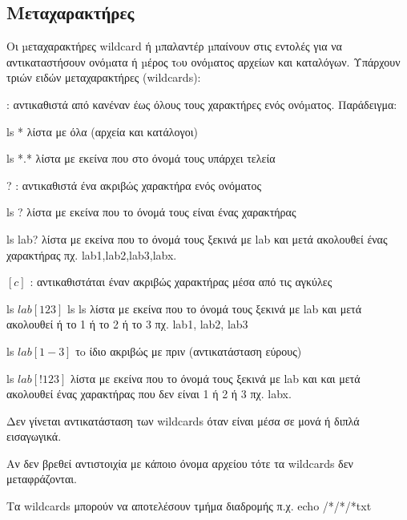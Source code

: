 \subsection{Μεταχαρακτήρες}

Oι µεταχαρακτήρες wildcard ή µπαλαντέρ µπαίνουν στις εντολές για να αντικαταστήσουν ονόµατα ή µέρος τoυ ονόµατος αρχείων και καταλόγων.
Υπάρχουν τριών ειδών μεταχαρακτήρες (wildcards):

\begin{packed_item}
  \item * : αντικαθιστά από κανέναν έως όλους τους χαρακτήρες ενός ονόµατος. Παράδειγμα:
        \begin{packed_item}
            \item ls * λίστα με όλα (αρχεία και κατάλογοι)
            \item ls *.* λίστα με εκείνα που στο όνομά τους υπάρχει τελεία
            \end{packed_item}
  \item ? : αντικαθιστά ένα ακριβώς χαρακτήρα ενός ονόματος
        \begin{packed_item}
            \item ls ? λίστα με εκείνα που το όνομά τους είναι ένας χαρακτήρας
            \item ls lab? λίστα με εκείνα που το όνομά τους ξεκινά με lab και μετά ακολουθεί ένας χαρακτήρας πχ. lab1,lab2,lab3,labx.
            \end{packed_item}
  \item $[c]$ : αντικαθιστάται έναν ακριβώς χαρακτήρας μέσα από τις αγκύλες
        \begin{packed_item}
            \item ls $lab[123]$ ls ls λίστα με εκείνα που το όνομά τους  ξεκινά με lab και μετά ακολουθεί ή το 1 ή το 2 ή το 3 πχ. lab1, lab2, lab3
            \item ls $lab[1-3]$ τo ίδιο ακριβώς με πριν (αντικατάσταση εύρους)
            \item ls $lab[!123]$ λίστα με εκείνα που το όνομά τους ξεκινά με lab και και μετά ακολουθεί ένας χαρακτήρας που δεν είναι 1 ή  2 ή 3 πχ. labx. 
            \end{packed_item}
  \item Δεν γίνεται αντικατάσταση των wildcards όταν είναι μέσα σε μονά ή διπλά εισαγωγικά.   
  \item Aν δεν βρεθεί αντιστοιχία με κάποιο όνομα αρχείου τότε τα wildcards δεν μεταφράζονται.
  \item Τα wildcards μπορούν να αποτελέσουν τμήμα διαδρομής π.χ. echo /*/*/*txt       
\end{packed_item}

